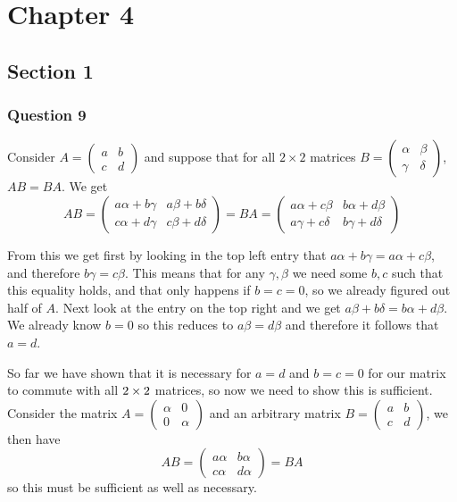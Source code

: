 \documentclass{article}
\begin{document}
\section{Chapter 4}
\subsection{Section 1}
\subsubsection{Question 9}
Consider $A = \left(\begin{matrix}
a&b\\c&d
\end{matrix}\right)$ and suppose that for all $2\times 2$ matrices $ B =  \left(\begin{matrix}
\alpha&\beta\\\gamma&\delta
\end{matrix}\right)$, $AB = BA$. We get
\[
AB = \left(\begin{matrix}
a\alpha+b\gamma&a\beta+b\delta \\
c\alpha+d\gamma&c\beta+d\delta
\end{matrix}\right) = BA = \left(\begin{matrix}
a\alpha+c\beta&b\alpha+d\beta\\
a\gamma+c\delta&b\gamma+d\delta
\end{matrix}
\right)
\]

From this we get first by looking in the top left entry that $a\alpha+b\gamma = a\alpha+c\beta$, and therefore $b\gamma = c\beta$. This means that for any $\gamma,\beta$ we need some $b,c$ such that this equality holds, and that only happens if $b=c=0$, so we already figured out half of $A$. Next look at the entry on the top right and we get $a\beta+b\delta = b\alpha+d\beta$. We already know $b=0$ so this reduces to $a\beta=d\beta$ and therefore it follows that $a=d$.

So far we have shown that it is necessary for $a=d$ and $b=c=0$ for our matrix to commute with all $2\times 2$ matrices, so now we need to show this is sufficient. Consider the matrix $ A= \left(\begin{matrix}
\alpha&0\\0&\alpha
\end{matrix}\right) $ and an arbitrary matrix $B = \left(\begin{matrix}
a&b\\c&d
\end{matrix}\right)$, we then have
\[AB = \left(
\begin{matrix}
a\alpha&b\alpha\\c\alpha&d\alpha
\end{matrix}
\right) = BA\] so this must be sufficient as well as necessary.
\end{document}
